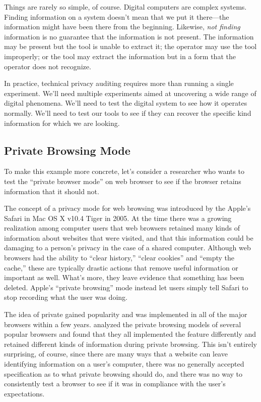 Things are rarely so simple, of course. Digital computers are
complex systems. Finding information on a system doesn't mean that we
put it there---the information might have been there from the
beginning. Likewise, \emph{not finding} information is no guarantee
that the information is not present. The information may be present
but the tool is unable to extract it; the operator may use the tool
improperly; or the tool may extract the information but in a form that
the operator does not recognize.

In practice, technical privacy auditing requires more than running a single
experiment. We'll need multiple experiments aimed at uncovering a wide
range of digital phenomena. We'll need to test the digital system
to see how it operates normally. We'll need to test our tools to see
if they can recover the specific kind information for which we are
looking.

\subsection{Private Browsing Mode}

To make this example more concrete, let's consider a researcher who
wants to test the ``private browser mode'' on web browser to see if
the browser retains information that it should not.

The concept of a privacy mode for web browsing was introduced by the
Apple's Safari in Mac OS X v10.4 Tiger in 2005. At the time there was
a growing realization among computer users that web browsers
retained many kinds of information about websites that were
visited, and that this information could be damaging to a person's
privacy in the case of a shared computer. Although web browsers had
the ability to ``clear history,'' ``clear cookies'' and ``empty the cache,'' these are
typically drastic actions that remove useful information or important
as well. What's more, they leave evidence that something has been
deleted. Apple's ``private browsing'' mode instead let users simply
tell Safari to stop recording what the user was doing.

The idea of private gained popularity and was implemented in all of
the major browsers within a few
years.  analyzed the private
browsing models of several popular browsers and found that they all
implemented the feature differently and retained different kinds of
information during private browsing. This isn't entirely surprising,
of course, since there are many ways that a website can leave
identifying information on a user's computer, there was no generally
accepted specification as to what private browsing should do, and
there was no way to consistently test a browser to see if it was in
compliance with the user's expectations.

